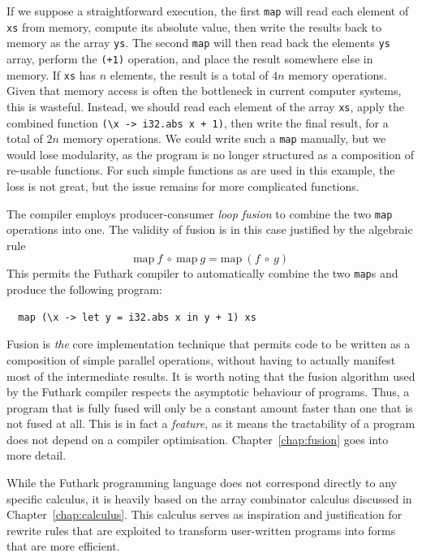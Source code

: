 If we suppose a straightforward execution, the first \lstinline{map}
will read each element of \lstinline{xs} from memory, compute its
absolute value, then write the results back to memory as the array
\lstinline{ys}.  The second \lstinline{map} will then read back the
elements \lstinline{ys} array, perform the \lstinline{(+1)} operation,
and place the result somewhere else in memory.  If \lstinline{xs} has
$n$ elements, the result is a total of $4n$ memory operations.  Given
that memory access is often the bottleneck in current computer
systems, this is wasteful.  Instead, we should read each element of
the array \lstinline{xs}, apply the combined function \lstinline{(\x -> i32.abs x + 1)}, then write the final result, for a total of $2n$
memory operations.  We could write such a \lstinline{map} manually,
but we would lose modularity, as the program is no longer structured
as a composition of re-usable functions.  For such simple functions as
are used in this example, the loss is not great, but the issue remains
for more complicated functions.

The compiler employs producer-consumer \textit{loop fusion} to combine
the two \lstinline{map} operations into one.  The validity of fusion
is in this case justified by the algebraic rule
\[
  \text{map}~f~\circ~\text{map}~g=\text{map}~(f~\circ~g)
\]
This permits the Futhark compiler to automatically combine the two
\lstinline{map}s and produce the following program:

\begin{lstlisting}
  map (\x -> let y = i32.abs x in y + 1) xs
\end{lstlisting}

Fusion is \textit{the} core implementation technique that permits code
to be written as a composition of simple parallel operations, without
having to actually manifest most of the intermediate results.  It is
worth noting that the fusion algorithm used by the Futhark compiler
respects the asymptotic behaviour of programs.  Thus, a program that
is fully fused will only be a constant amount faster than one that is
not fused at all.  This is in fact a \textit{feature}, as it means the
tractability of a program does not depend on a compiler optimisation.
Chapter~\ref{chap:fusion} goes into more detail.

While the Futhark programming language does not correspond directly to
any specific calculus, it is heavily based on the array combinator
calculus discussed in Chapter~\ref{chap:calculus}.  This calculus
serves as inspiration and justification for rewrite rules that are
exploited to transform user-written programs into forms that are more
efficient.

